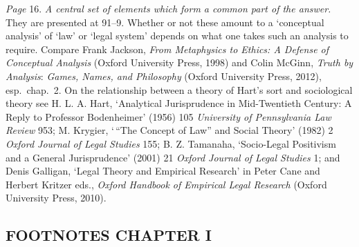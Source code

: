\emph{Page} 16. \emph{A central set of elements which form a common part
of the answer.} They are presented at 91--9. Whether or not these amount
to a `conceptual analysis' of `law' or `legal system' depends on what
one takes such an analysis to require. Compare Frank Jackson, \emph{From
Metaphysics to Ethics: A Defense of Conceptual Analysis} (Oxford
University Press, 1998) and Colin McGinn, \emph{Truth by Analysis}:
\emph{Games, Names, and Philosophy} (Oxford University Press, 2012),
esp.~chap.~2. On the relationship between a theory of Hart's sort and
sociological theory see H. L. A. Hart, `Analytical Jurisprudence in
Mid-Twentieth Century: A Reply to Professor Bodenheimer' (1956) 105
\emph{University of Pennsylvania Law Review} 953; M. Krygier, `\,``The
Concept of Law'' and Social Theory' (1982) 2 \emph{Oxford Journal of
Legal Studies} 155; B. Z. Tamanaha, `Socio-Legal Positivism and a
General Jurisprudence' (2001) 21 \emph{Oxford Journal of Legal Studies}
1; and Denis Galligan, `Legal Theory and Empirical Research' in Peter
Cane and Herbert Kritzer eds., \emph{Oxford Handbook of Empirical Legal
Research} (Oxford University Press, 2010).

\subsection{FOOTNOTES CHAPTER
I}\label{footnotes-chapter-i}  %


